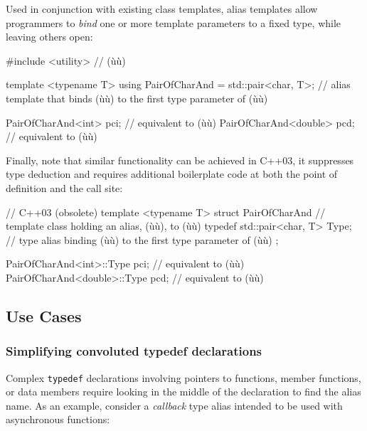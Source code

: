 \noindent Used in conjunction with existing class templates, alias templates allow
programmers to \emph{bind} one or more template parameters to a fixed
type, while leaving others open:

\begin{emcppslisting}[language=C++]
#include <utility>  // (ù{}ù)

template <typename T>
using PairOfCharAnd = std::pair<char, T>;
    // alias template that binds (ù{}ù) to the first type parameter of (ù{}ù)

PairOfCharAnd<int>    pci;  // equivalent to (ù{}ù)
PairOfCharAnd<double> pcd;  // equivalent to (ù{}ù)
\end{emcppslisting}
    
\noindent Finally, note that similar functionality can be
achieved in C++03, it suppresses type deduction and requires additional boilerplate code at both the
point of definition and the call site:

\begin{emcppslisting}[language=C++]
// C++03 (obsolete)
template <typename T>
struct PairOfCharAnd
    // template class holding an alias, (ù{}ù), to (ù{}ù)
{
    typedef std::pair<char, T> Type;
        // type alias binding (ù{}ù) to the first type parameter of (ù{}ù)
};

PairOfCharAnd<int>::Type    pci;  // equivalent to (ù{}ù)
PairOfCharAnd<double>::Type pcd;  // equivalent to (ù{}ù)
\end{emcppslisting}
    

\subsection[Use Cases]{Use Cases}\label{use-cases}

\subsubsection[Simplifying convoluted \lstinline!typedef! declarations]{Simplifying convoluted {\SubsubsecCode typedef} declarations}\label{simplifying-convoluted-typedef-declarations}

Complex \lstinline!typedef! declarations involving pointers to functions,
member functions, or data members require looking in the middle of the
declaration to find the alias name. As an example, consider a
\emph{callback} type alias intended to be used with asynchronous functions:

